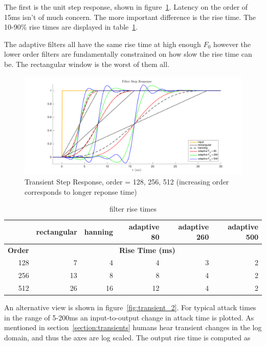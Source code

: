 \documentclass [11pt, proquest,oneside] {ganter_thesis}[2015/03/03]
\begin{document}
The first is the unit step response, shown in figure~\ref{fig:transient_1}.  Latency on the order of 15ms isn't of much concern.  The more important difference is the rise time.  The 10-90\% rise times are displayed in table~\ref{table:rise_times}.

The adaptive filters all have the same rise time at high enough $F_0$ however the lower order filters are fundamentally constrained on how slow the rise time can be.  The rectangular window is the worst of them all.

\begin{figure}[!ht]
  \centering
    \includegraphics[width=1\textwidth]{transient_1}
    \caption{Transient Step Response, order = 128, 256, 512 (increasing order corresponds to longer reponse time)}\label{fig:transient_1}
\end{figure}

\begin{table}
\begin{center}
\begin{tabular}{| r | r | r | r | r | r |}
  \hline
    & rectangular & hanning & adaptive 80 & adaptive 260 & adaptive 500 \\ \hline
  \textbf{Order} & \multicolumn{5}{|c|}{\textbf{Rise Time (ms)}} \\ \hline
  128 & 7 & 4 & 4 & 3 & 2 \\ \hline
  256 & 13 & 8 & 8 & 4 & 2 \\ \hline
  512 & 26 & 16 & 12 & 4 & 2 \\ \hline
\end{tabular}
\end{center}
\caption{filter rise times}\label{table:rise_times}
\end{table}

An alternative view is shown in figure~\ref{fig:transient_2}.  For typical attack times in the range of 5-200ms an input-to-output change in attack time is plotted.  As mentioned in section~\ref{section:transients} humans hear transient changes in the log domain, and thus the axes are log scaled.  The output rise time is computed as
\end{document}
